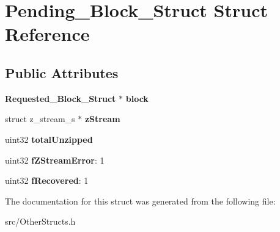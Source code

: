 \section{Pending\_\-Block\_\-Struct Struct Reference}
\label{structPending__Block__Struct}
\subsection*{Public Attributes}
\begin{DoxyCompactItemize}
\item 
{\bf Requested\_\-Block\_\-Struct} $\ast$ {\bfseries block}\label{structPending__Block__Struct_a19bec41e121f476cc3bb7ce6668dbf56}

\item 
struct z\_\-stream\_\-s $\ast$ {\bfseries zStream}\label{structPending__Block__Struct_a2d8c5eaf54036c3f928666e3f53caf63}

\item 
uint32 {\bfseries totalUnzipped}\label{structPending__Block__Struct_a06e6f80e461b5dc02433dea911610c24}

\item 
uint32 {\bfseries fZStreamError}: 1\label{structPending__Block__Struct_a64b653787b251963bafa9c771d2d1cf4}

\item 
uint32 {\bfseries fRecovered}: 1\label{structPending__Block__Struct_a6621e8f2c90d5e963da49de5fb5149fe}

\end{DoxyCompactItemize}


The documentation for this struct was generated from the following file:\begin{DoxyCompactItemize}
\item 
src/OtherStructs.h\end{DoxyCompactItemize}
